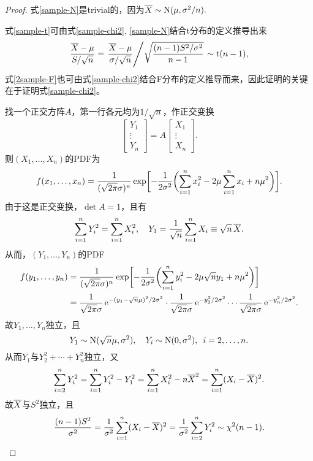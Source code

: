 \begin{proof}
	式\eqref{sample-N}是trivial的，因为$\overline{X}\sim\operatorname{N}(\mu,\sigma^2/n).$
	
	式\eqref{sample-t}可由式\eqref{sample-chi2}, \eqref{sample-N}结合t分布的定义推导出来
	\[
		\frac{\overline{X}-\mu}{S/\sqrt n}=\left.{\frac{\overline{X}-\mu}{\sigma/\sqrt n}}\middle/{\sqrt{\frac{(n-1)S^2/\sigma^2}{n-1}}}\right.\sim\mathrm t(n-1),
	\]
	式\eqref{2sample-F}也可由式\eqref{sample-chi2}结合F分布的定义推导而来，因此证明的关键在于证明式\eqref{sample-chi2}。
	
	找一个正交方阵$A$，第一行各元均为$1/\sqrt n$，作正交变换
	\[
		\begin{bmatrix}
			Y_1\\\vdots\\Y_n
		\end{bmatrix}=A\begin{bmatrix}
			X_1\\\vdots\\X_n
		\end{bmatrix}.
	\]
	则$(X_1,\ldots,X_n)$的PDF为
	\[
		f(x_1,\ldots,x_n)=\frac1{(\sqrt{2\pi}\sigma)^n}\exp\biggl[-\frac1{2\sigma^2}\biggl(\sum_{i=1}^nx_i^2-2\mu\sum_{i=1}^nx_i+n\mu^2\biggr)\biggr].
	\]
	由于这是正交变换，$\det A=1$，且有
	\[
		\sum_{i=1}^nY_i^2=\sum_{i=1}^nX_i^2,\quad Y_1=\frac1{\sqrt n}\sum_{i=1}^nX_i\equiv\sqrt n\,\overline{X}.
	\]
	从而，$(Y_1,\ldots,Y_n)$的PDF
	\begin{align*}
		f(y_1,\ldots,y_n)&=\frac1{(\sqrt{2\pi}\sigma)^n}\exp\biggl[-\frac1{2\sigma^2}\biggl(\sum_{i=1}^ny_i^2-2\mu\sqrt ny_1+n\mu^2\biggr)\biggr]\\
		&=\frac1{\sqrt{2\pi}\sigma}\mathop{}\!\mathrm{e}^{-(y_1-\sqrt n\mu)^2/2\sigma^2}\cdot\frac1{\sqrt{2\pi}\sigma}\mathop{}\!\mathrm{e}^{-y_2^2/2\sigma^2}\cdots\frac1{\sqrt{2\pi}\sigma}\mathop{}\!\mathrm{e}^{-y_n^2/2\sigma^2}.
	\end{align*}
	故$Y_1,\ldots,Y_n$独立，且
	\[
		Y_1\sim\operatorname{N}(\sqrt n\mu,\sigma^2),\quad Y_i\sim\operatorname{N}(0,\sigma^2),\enspace i=2,\ldots,n.
	\]
	从而$Y_1$与$Y_2^2+\cdots+Y_n^2$独立，又
	\[
		\sum_{i=2}^nY_i^2=\sum_{i=1}^nY_i^2-Y_1^2=\sum_{i=1}^nX_i^2-n\overline{X}^2=\sum_{i=1}^n(X_i-\overline{X})^2.
	\]
	故$\overline{X}$与$S^2$独立，且
	\[
		\frac{(n-1)S^2}{\sigma^2}=\frac1{\sigma^2}\sum_{i=1}^n(X_i-\overline{X})^2=\frac1{\sigma^2}\sum_{i=2}^nY_i^2\sim\chi^2(n-1).
	\]
\end{proof}